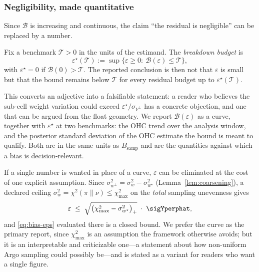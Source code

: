 \subsubsection*{Negligibility, made quantitative}
\label{sec:breakdown}

Since $\mathcal{B}$ is increasing and continuous, the claim ``the
residual is negligible'' can be replaced by a number.

\begin{definition}
\label{def:breakdown}
Fix a benchmark $\mathcal{T}>0$ in the units of the estimand. The
\emph{breakdown budget} is
\[
  \varepsilon^{\star}(\mathcal{T})
  :=\sup\{\varepsilon\ge0:\ \mathcal{B}(\varepsilon)\le\mathcal{T}\},
\]
with $\varepsilon^{\star}=0$ if $\mathcal{B}(0)>\mathcal{T}$. The
reported conclusion is then not that $\varepsilon$ is small but that the
bound remains below $\mathcal{T}$ for every residual budget up to
$\varepsilon^{\star}(\mathcal{T})$.
\end{definition}

This converts an adjective into a falsifiable statement: a reader who
believes the sub-cell weight variation could exceed
$\varepsilon^{\star}/\sigma_{Y^{\perp}}$ has a concrete objection, and
one that can be argued from the float geometry. We report
$\mathcal{B}(\varepsilon)$ as a curve, together with
$\varepsilon^{\star}$ at two benchmarks: the OHC trend over the analysis
window, and the posterior standard deviation of the OHC estimate the
bound is meant to qualify. Both are in the same units as
$B_{\mathrm{samp}}$ and are the quantities against which a bias is
decision-relevant.

\begin{remark}
\label{rem:chi2-ceiling}
If a single number is wanted in place of a curve, $\varepsilon$ can be
eliminated at the cost of one explicit assumption. Since
$\sigma_{w^{\perp}}^2=\sigma_w^2-\sigma_{w^{\star}}^2$
(Lemma~\ref{lem:coarsening}), a declared ceiling
$\sigma_w^2=\chi^2(\pi\|\nu)\le\chi^2_{\max}$ on the \emph{total}
sampling unevenness gives
\[
  \varepsilon\;\le\;\sqrt{\big(\chi^2_{\max}-\sigma_{w^{\star}}^2\big)_+}
  \;\cdot\;\sigYperphat ,
\]
and \eqref{eq:bias-eps} evaluated there is a closed bound. We prefer the
curve as the primary report, since $\chi^2_{\max}$ is an assumption the
framework otherwise avoids; but it is an interpretable and criticizable
one---a statement about how non-uniform Argo sampling could possibly
be---and is stated as a variant for readers who want a single figure.
\end{remark}

